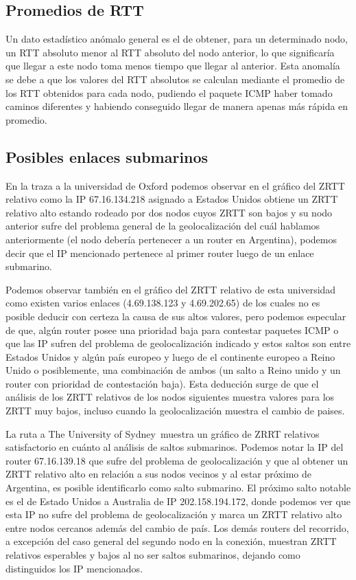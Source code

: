 \documentclass[a4paper, 10pt, twoside]{article}
\newcommand{\sydney}{The University of Sydney}
\begin{document}
\subsection{Promedios de RTT}
Un dato estadístico anómalo general es el de obtener, para un determinado nodo, un RTT absoluto menor al RTT absoluto del nodo anterior, lo que significaría que llegar a este nodo toma menos tiempo que llegar al anterior. Esta anomalía se debe a que los valores del RTT absolutos se calculan mediante el promedio de los RTT obtenidos para cada nodo, pudiendo el paquete ICMP haber tomado caminos diferentes y habiendo conseguido llegar de manera apenas más rápida en promedio.

\subsection{Posibles enlaces submarinos}
En la traza a la universidad de Oxford podemos observar en el gráfico del ZRTT relativo como la IP 67.16.134.218 asignado a Estados Unidos obtiene un ZRTT relativo alto estando rodeado por dos nodos cuyos ZRTT son bajos y su nodo anterior sufre del problema general de la geolocalización del cuál hablamos anteriormente (el nodo debería pertenecer a un router en Argentina), podemos decir que el IP mencionado pertenece al primer router luego de un enlace submarino.
 
Podemos observar también en el gráfico del ZRTT relativo de esta universidad como existen varios enlaces (4.69.138.123 y 4.69.202.65) de los cuales no es posible deducir con certeza la causa de sus altos valores, pero podemos especular de que, algún router posee una prioridad baja para contestar paquetes ICMP o que las IP sufren del problema de geolocalización indicado y estos saltos son entre Estados Unidos y algún país europeo y luego de el continente europeo a Reino Unido o posiblemente, una combinación de ambos (un salto a Reino unido y un router con prioridad de contestación baja). Esta deducción surge de que el análisis de los ZRTT relativos de los nodos siguientes muestra valores para los ZRTT muy bajos, incluso cuando la geolocalización muestra el cambio de paises.
 
La ruta a \sydney \ muestra un gráfico de ZRRT relativos satisfactorio en cuánto al análisis de saltos submarinos. Podemos notar la IP del router 67.16.139.18 que sufre del problema de geolocalización y que al obtener un ZRTT relativo alto en relación a sus nodos vecinos y al estar próximo de Argentina, es posible identificarlo como salto submarino. El próximo salto notable es el de Estado Unidos a Australia de IP 202.158.194.172, donde podemos ver que esta IP no sufre del problema de geolocalización y marca un ZRTT relativo alto entre nodos cercanos además del cambio de país. Los demás routers del recorrido, a excepción del caso general del segundo nodo en la conexión, muestran ZRTT relativos esperables y bajos al no ser saltos submarinos, dejando como distinguidos los IP mencionados.
 
\end{document}
